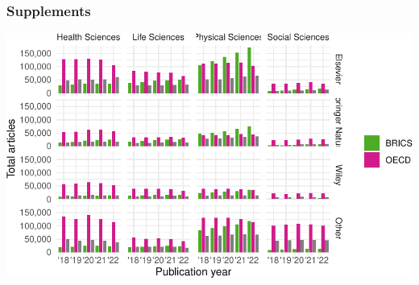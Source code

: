 \documentclass[a4paper,man,floatsintext,longtable,noextraspace,12pt]{apa6}
\begin{document}
\hypertarget{supplements}{%
\subsubsection{Supplements}\label{supplements}}

\begin{center}\includegraphics[width=0.99\linewidth]{fig/unnamed-chunk-10-1} \end{center}
\end{document}
